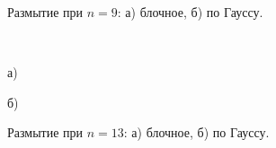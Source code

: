 \documentclass[a5paper, 10pt]{article}
\theoremstyle{definition}
\theoremstyle{plain}
\theoremstyle{remark}
\begin{document}
\begin{figure}[h!]
\begin{minipage}[h!]{0.47\linewidth}
\end{minipage}
\caption{Размытие при $n= 9$: а) блочное, б) по Гауссу.}
\,
\vfill
\begin{minipage}[h!]{0.47\linewidth}
 а) \\
\end{minipage}
\hfill
\begin{minipage}[h!]{0.47\linewidth}
 б) \\
\end{minipage}
\caption{Размытие при $n= 13$: а) блочное, б) по Гауссу.}
\end{figure}
\end{document}
